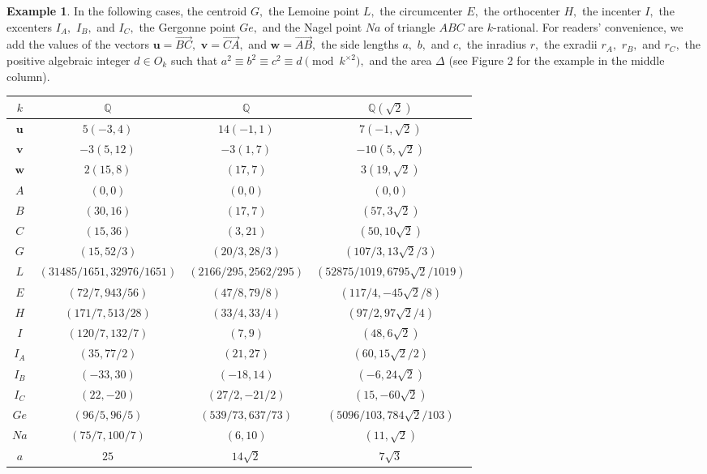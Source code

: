 \documentclass{article}
\theoremstyle{definition}
\newtheorem{eg}{Example}
\theoremstyle{plain}
\begin{document}
\begin{eg}
In the following cases, the centroid $G,$ the Lemoine point $L,$ the circumcenter $E,$ the orthocenter $H,$ the incenter $I,$ the excenters $I_A,$ $I_B,$ and $I_C,$ the Gergonne point $Ge,$ and the Nagel point $Na$ of triangle $ABC$ are $k$-rational. 
For readers' convenience, we add the values of the vectors $\bm{u} = \overrightarrow{BC},$ $\bm{v} = \overrightarrow{CA},$ and $\bm{w} = \overrightarrow{AB},$ the side lengths $a,$ $b,$ and $c,$ the inradius $r,$ the exradii $r_A,$ $r_B,$ and $r_C,$ the positive algebraic integer $d \in O_k$ such that $a^2 \equiv b^2 \equiv c^2 \equiv d \pmod{k^{\times 2}},$ and the area $\Delta$ (see Figure 2 for the example in the middle column).
\begin{center}\begin{tabular}{|c||c|c|c|} \hline 
$k$ & $\mathbb Q$ & $\mathbb Q$ & $\mathbb Q(\sqrt 2)$ \\ \hline 
$\bm{u}$ & $5(-3,4)$ & $14(-1,1)$ & $7(-1,\sqrt 2)$ \\ 
$\bm{v}$ & $-3(5,12)$ & $-3(1,7)$ & $-10(5,\sqrt 2)$ \\ 
$\bm{w}$ & $2(15,8)$ & $(17,7)$ & $3(19,\sqrt 2)$ \\ \hline 
$A$ & $(0,0)$ & $(0,0)$ & $(0,0)$ \\ 
$B$ & $(30,16)$ & $(17,7)$ & $(57,3\sqrt 2)$ \\ 
$C$ & $(15,36)$ & $(3,21)$ & $(50,10\sqrt 2)$ \\ \hline 
$G$ & $(15,52/3)$ & $(20/3,28/3)$ & $(107/3,13\sqrt 2/3)$ \\ 
$L$ & $(31485/1651,32976/1651)$ & $(2166/295,2562/295)$ & $(52875/1019,6795\sqrt 2/1019)$ \\ 
$E$ & $(72/7,943/56)$ & $(47/8,79/8)$ & $(117/4,-45\sqrt 2/8)$ \\ 
$H$ & $(171/7,513/28)$ & $(33/4,33/4)$ & $(97/2,97\sqrt 2/4)$ \\ \hline 
$I$ & $(120/7,132/7)$ & $(7,9)$ & $(48,6\sqrt 2)$ \\ 
$I_A$ & $(35,77/2)$ & $(21,27)$ & $(60,15\sqrt 2/2)$ \\ 
$I_B$ & $(-33,30)$ & $(-18,14)$ & $(-6,24\sqrt 2)$ \\ 
$I_C$ & $(22,-20)$ & $(27/2,-21/2)$ & $(15,-60\sqrt 2)$ \\ 
$Ge$ & $(96/5,96/5)$ & $(539/73,637/73)$ & $(5096/103,784\sqrt 2/103)$ \\ 
$Na$ & $(75/7,100/7)$ & $(6,10)$ & $(11,\sqrt 2)$ \\ \hline 
$a$ & $25$ & $14\sqrt 2$ & $7\sqrt 3$ \\ 

\end{tabular}
\end{center}
\end{eg}
\end{document}
